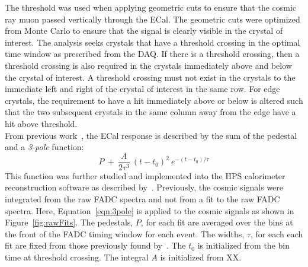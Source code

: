 \documentclass[twoside]{article}
\begin{document}
\indent The threshold was used when applying geometric cuts to ensure that the cosmic ray muon passed vertically through the ECal. The geometric cuts were optimized from Monte Carlo to ensure that the signal is clearly visible in the crystal of interest. The analysis seeks crystals that have a threshold crossing in the optimal time window as prescribed from the DAQ. If there is a threshold crossing, then a threshold crossing is also required in the crystals immediately above and below the crystal of interest. A threshold crossing must not exist in the crystals to the immediate left and right of the crystal of interest in the same row. For edge crystals, the requirement to have a hit immediately above or below is altered such that the two subsequent crystals in the same column away from the edge have a hit above threshold.\\ 
\indent From previous work~\cite{charles_2014}, the ECal response is described by the sum of the pedestal and a {\em 3-pole} function:
\begin{equation}
  P\ +\ \frac{A}{2\tau^3}\ (t-t_0)^2\ e^{-(t-t_0)/\tau}
  \label{eqn:3pole}
\end{equation}
This function was further studied and implemented into the HPS calorimeter reconstruction software as described by~\cite{baltzell_ecal_2015}. Previously, the cosmic signals were integrated from the raw FADC spectra and not from a fit to the raw FADC spectra. Here, Equation~\eqref{eqn:3pole} is applied to the cosmic signals as shown in Figure~\ref{fig:rawFits}. The pedestals, $P$, for each fit are averaged over the bins at the front of the FADC timing window for each event. The widths, $\tau$, for each each fit are fixed from those previously found by~\cite{baltzell_ecal_2015}. The $t_0$ is initialized from the bin time at threshold crossing. The integral $A$ is initialized from XX.\\ 
\end{document}
